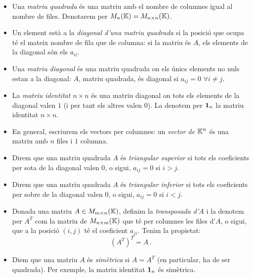 \documentclass[
  11pt,
]{book}
\numberwithin{dummy}{section}
\theoremstyle{maincolornumbox}
\theoremstyle{blacknumex}
\theoremstyle{blacknumbox}
\theoremstyle{maincolornum}
\begin{document}
\begin{itemize}
\item
  Una \emph{matriu quadrada} és una matriu amb el nombre de columnes igual
  al nombre de files. Denotarem per \(M_n(\mathbb{K})=M_{n\times n}(\mathbb{K})\).
\item
  Un element està a la \emph{diagonal d'una matriu quadrada} si la posició
  que ocupa té el mateix nombre de fila que de columna: si la matriu
  és \(A\), els elements de la diagonal són els \(a_{ii}\).
\item
  Una \emph{matriu diagonal} és una matriu quadrada on els únics elements
  no nuls estan a la diagonal: \(A\), matriu quadrada, és diagonal si
  \(a_{ij}=0\) \(\forall i\neq j\).
\item
  La \emph{matriu identitat \(n\times n\)} és una matriu diagonal on tots els
  elements de la diagonal valen \(1\) (i per tant els altres valen \(0\)).
  La denotem per \(\mathbf{1}_n\) la matriu identitat \(n\times n\).
\item
  En general, escriurem els vectors per columnes: un \emph{vector de
  \(\mathbb{K}^n\)} és una matriu amb \(n\) files i \(1\) columna.
\item
  Direm que una matriu quadrada \(A\) és \emph{triangular superior} si tots
  els coeficients per sota de la diagonal valen \(0\), o sigui,
  \(a_ {ij}=0\) si \(i>j\).
\item
  Direm que una matriu quadrada \(A\) és \emph{triangular inferior} si tots
  els coeficients per sobre de la diagonal valen \(0\), o sigui,
  \(a_ {ij}=0\) si \(i<j\).
\item
  Donada una matriu \(A \in M_{m\times n}(\mathbb{K})\), definim la \emph{transposada
  d'\(A\)} i la denotem per \(A^T\) com la matriu de \(M_{n\times m}(\mathbb{K})\)
  que té per columnes les files d'\(A\), o sigui, que a la posició
  \((i,j)\) té el coeficient \(a_{ji}\). Tenim la propietat:
  \[(A^T)^T=A \,.\]
\item
  Diem que una matriu \(A\) és \emph{simètrica} si \(A=A^T\) (en particular, ha
  de ser quadrada). Per exemple, la matriu identitat \(\mathbf{1}_n\) és
  simètrica.
\end{itemize}
\end{document}
